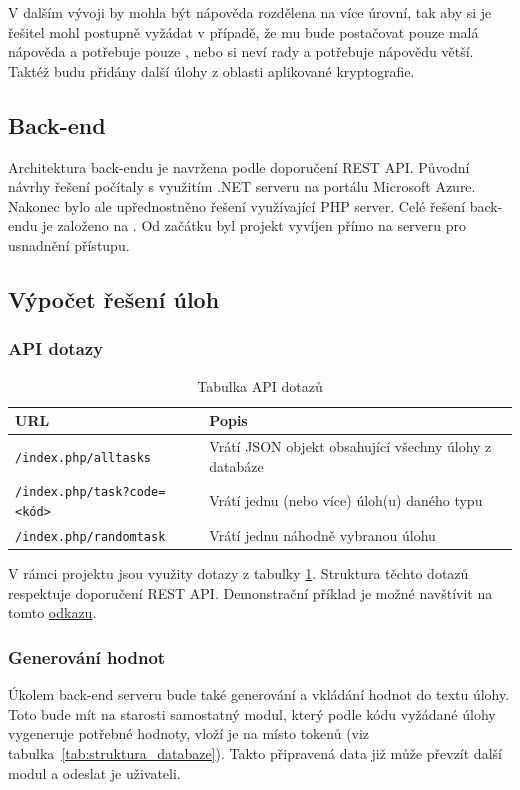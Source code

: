 \documentclass[titlepage]{article}
\begin{document}
V dalším vývoji by mohla být nápověda rozdělena na více úrovní, tak aby si je řešitel mohl postupně vyžádat v případě, že mu bude postačovat pouze malá nápověda a potřebuje pouze , nebo si neví rady a potřebuje nápovědu větší. Taktéž budu přidány další úlohy z oblasti aplikované kryptografie.   

\subsection{Back-end}
Architektura back-endu je navržena podle doporučení REST API. Původní návrhy řešení počítaly s využitím .NET serveru na portálu Microsoft Azure. Nakonec bylo ale upřednostněno řešení využívající PHP server. Celé řešení back-endu je založeno na \cite{restapi}. Od začátku byl projekt vyvíjen přímo na serveru pro usnadnění přístupu. 

\subsection{Výpočet řešení úloh}

\subsubsection{API dotazy}
\begin{table}[b]
    \centering
    \caption{Tabulka API dotazů}
    \label{tab:api_dotazy}
    \vspace{.5em}
    \begin{tabular}{|l | p{5cm} |}
        \hline
        \textbf{URL} & \textbf{Popis} \\
        \hline \hline
      \texttt{/index.php/alltasks} & Vrátí JSON objekt obsahující všechny úlohy z databáze \\
        \hline
        \texttt{/index.php/task?code=<kód>} & Vrátí jednu (nebo více) úloh(u) daného typu \\
        \hline
        \texttt{/index.php/randomtask} & Vrátí jednu náhodně vybranou úlohu \\
        \hline
    \end{tabular}
\end{table}

V rámci projektu jsou využity dotazy z tabulky \ref{tab:api_dotazy}. Struktura těchto dotazů respektuje doporučení REST API. Demonstrační příklad je možné navštívit na tomto \href{http://vut-fekt-mpckry-gr14.8u.cz/index.php/alltasks}{odkazu}.

\subsubsection{Generování hodnot}
Úkolem back-end serveru bude také generování a vkládání hodnot do textu úlohy. Toto bude mít na starosti samostatný modul, který podle kódu vyžádané úlohy vygeneruje potřebné hodnoty, vloží je na místo tokenů  (viz tabulka~\ref{tab:struktura_databaze}). Takto připravená data již může převzít další modul a odeslat je uživateli. 
\end{document}
